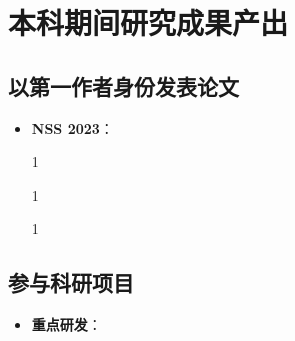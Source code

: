 
\chapter*{本科期间研究成果产出}

\section*{以第一作者身份发表论文}

\begin{itemize}
\item 
\textbf{NSS 2023}：
\item[1]
\item[1]
\item[1]

\end{itemize}

\section*{参与科研项目}

\begin{itemize}
\item 
\textbf{重点研发}：


\end{itemize}

\clearpage
\endinput